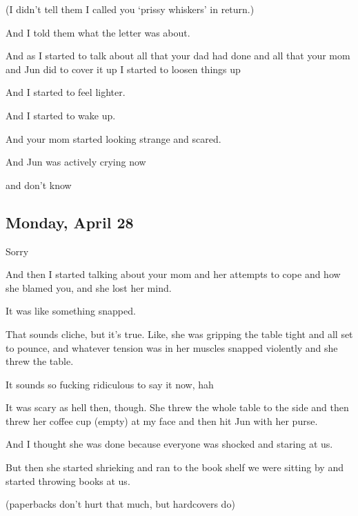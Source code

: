 {
(I didn't tell them I called you
`prissy whiskers' in return.)

 And I told them what the letter was about.

 And as I started to talk about all that your dad had done and all that your mom and Jun did to cover it up I started to loosen things up

 And I started to feel lighter.

 And I started to wake up.

 And your mom started looking strange and scared.

 And Jun was actively crying now

 and don't know

\newpage

\subsection*{Monday, April 28}\label{monday-april-28}

 Sorry

 And then I started talking about your mom and her attempts to cope and how she blamed you, and she lost her mind.

 It was like something snapped.

 That sounds cliche, but it's true. Like, she was gripping the table tight and all set to pounce, and whatever tension was in her muscles snapped violently and she threw the table.

 It sounds so fucking ridiculous to say it now, hah

 It was scary as hell then, though. She threw the whole table to the side and then threw her coffee cup
(empty) at my face and then hit Jun with her purse.

 And I thought she was done because everyone was shocked and staring at us.

 But then she started shrieking and ran to the book shelf we were sitting by and started throwing books at us.

(paperbacks don't hurt that much, but hardcovers do)

}
